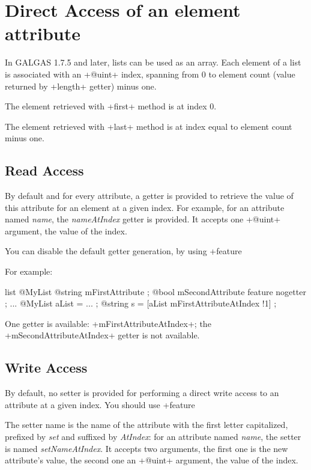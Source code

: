 \section{Direct Access of an element attribute}

In GALGAS 1.7.5 and later, lists can be used as an array. Each element of a list is associated with an \ggs+@uint+ index, spanning from 0 to element count (value returned by \ggs+length+ getter) minus one.

The element retrieved with \ggs+first+ method is at index 0.

The element retrieved with \ggs+last+ method is at index equal to element count minus one.

\subsection{Read Access}

By default and for every attribute, a getter is provided to retrieve the value of this attribute for an element at a given index. For example, for an attribute named \emph{name}, the \emph{nameAtIndex} getter is provided. It accepts one \ggs+@uint+ argument, the value of the index.

You can disable the default getter generation, by using \ggs+feature %

For example:
\begin{galgas}
list @MyList {
  @string mFirstAttribute ;
  @bool mSecondAttribute feature nogetter ;
}
...
@MyList aList = ... ;
@string s = [aList mFirstAttributeAtIndex !1] ;
\end{galgas}

One getter is available: \ggs+mFirstAttributeAtIndex+; the \ggs+mSecondAttributeAtIndex+ getter is not available.


\subsection{Write Access}

By default, no setter is provided for performing a direct write access to an attribute at a given index. You should use \ggs+feature %

The setter name is the name of the attribute with the first letter capitalized, prefixed by \emph{set} and suffixed by \emph{AtIndex}: for an attribute named \emph{name}, the setter is named \emph{setNameAtIndex}. It accepts two arguments, the first one is the new attribute's value, the second one an \ggs+@uint+ argument, the value of the index.

